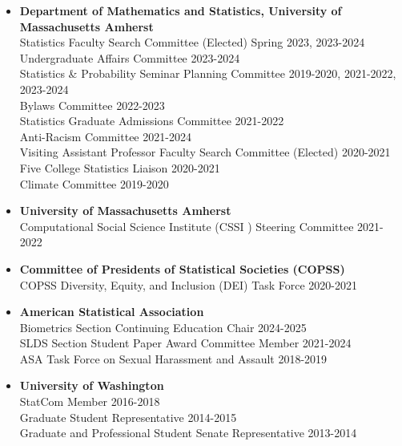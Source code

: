 \documentclass[11pt]{article}
\begin{document}
\begin{itemize} 
	\item[] \textbf{Department of Mathematics and Statistics, University of Massachusetts Amherst} \\ 
	Statistics Faculty Search Committee (Elected) \hfill Spring 2023, 2023-2024 \\
	Undergraduate Affairs Committee \hfill 2023-2024\\
	Statistics \& Probability Seminar Planning Committee \hfill 2019-2020, 2021-2022, 2023-2024 \\
	Bylaws Committee \hfill 2022-2023\\
	Statistics Graduate Admissions Committee \hfill 2021-2022 \\
	Anti-Racism Committee \hfill 2021-2024 \\
	Visiting Assistant Professor Faculty Search Committee (Elected) \hfill 2020-2021 \\
	Five College Statistics Liaison \hfill 2020-2021 \\
	Climate Committee \hfill 2019-2020\vspace{-2mm}
	\item[] \textbf{University of Massachusetts Amherst} \\ 
	Computational Social Science Institute (CSSI ) Steering Committee \hfill 2021-2022\vspace{-2mm}
	\item[] \textbf{Committee of Presidents of Statistical Societies (COPSS)} \\ 
	COPSS Diversity, Equity, and Inclusion (DEI) Task Force \hfill 2020-2021\vspace{-2mm}
	\item[] \textbf{American Statistical Association} \\ 
	Biometrics Section Continuing Education Chair \hfill 2024-2025 \\
	SLDS Section Student Paper Award Committee Member \hfill 2021-2024 \\
	ASA Task Force on Sexual Harassment and Assault \hfill 2018-2019\vspace{-2mm}
	\item[] \textbf{University of Washington} \\
	StatCom Member \hfill 2016-2018 \\
	Graduate Student Representative \hfill 2014-2015 \\
	Graduate and Professional Student Senate Representative \hfill 2013-2014\vspace{-2mm}
\end{itemize}
\end{document}
